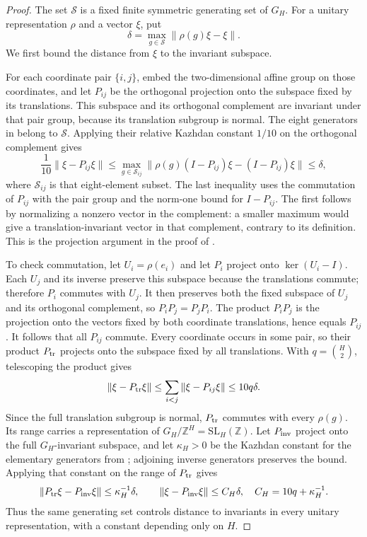 \begin{proof}
The set $\mathcal S$ is a fixed finite symmetric generating set of $G_H$.
For a unitary representation $\rho$ and a vector $\xi$, put
\[
\delta=\max_{g\in\mathcal S}\|\rho(g)\xi-\xi\|.
\]
We first bound the distance from $\xi$ to the invariant subspace.

For each coordinate pair $\{i,j\}$, embed the two-dimensional affine
group on those coordinates, and let $P_{ij}$ be the orthogonal projection
onto the subspace fixed by its translations. This subspace and its
orthogonal complement are invariant under that pair group, because its
translation subgroup is normal. The eight generators in
\cite[Theorem~2.1, p.~152]{Shalom1999} belong to $\mathcal S$. Applying their
relative Kazhdan constant $1/10$ on the orthogonal complement gives
\[
 \frac1{10}\|\xi-P_{ij}\xi\|
 \le \max_{g\in\mathcal S_{ij}}
       \|\rho(g)(I-P_{ij})\xi-(I-P_{ij})\xi\|
 \le\delta,
\]
where $\mathcal S_{ij}$ is that eight-element subset. The last
inequality uses the commutation of $P_{ij}$ with the pair group
and the norm-one bound for $I-P_{ij}$. The first follows by
normalizing a nonzero vector in the complement: a smaller maximum
would give a translation-invariant vector in that complement,
contrary to its definition.
This is the projection argument in the proof of
\cite[Corollary~2.3, p.~154]{Shalom1999}.

To check commutation, let $U_i=\rho(e_i)$ and let $P_i$ project
onto $\ker(U_i-I)$. Each $U_j$ and its inverse preserve this
subspace because the translations commute; therefore $P_i$ commutes
with $U_j$. It then preserves both the fixed subspace of $U_j$ and
its orthogonal complement, so $P_iP_j=P_jP_i$. The product
$P_iP_j$ is the projection onto the vectors fixed by both coordinate
translations, hence equals $P_{ij}$. It follows that all $P_{ij}$
commute. Every coordinate occurs in some pair, so their product
$P_{\rm tr}$ projects onto the subspace fixed by all translations. With $q=\binom H2$, telescoping
the product gives
\[
\|\xi-P_{\rm tr}\xi\|
\le\sum_{i<j}\|\xi-P_{ij}\xi\|
\le10q\delta.
\]
Since the full translation subgroup is normal, $P_{\rm tr}$ commutes
with every $\rho(g)$. Its range carries a representation of
$G_H/\mathbb Z^H=\mathrm{SL}_H(\mathbb Z)$. Let $P_{\rm inv}$ project onto the
full $G_H$-invariant subspace, and let $\kappa_H>0$ be the Kazhdan
constant for the elementary generators from
\cite[Theorem~2.6, p.~156]{Shalom1999}; adjoining inverse generators
preserves the bound. Applying that constant on the range of
$P_{\rm tr}$ gives
\[
\|P_{\rm tr}\xi-P_{\rm inv}\xi\|\le\kappa_H^{-1}\delta,
\qquad
\|\xi-P_{\rm inv}\xi\|\le C_H\delta,
\quad C_H=10q+\kappa_H^{-1}.
\]
Thus the same generating set controls distance to invariants in every
unitary representation, with a constant depending only on $H$.


\end{proof}
